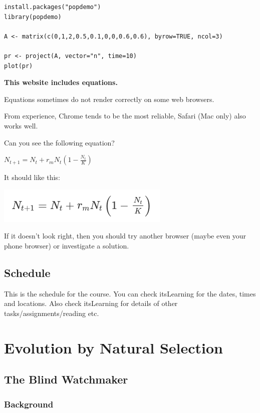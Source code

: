 \documentclass[
  a4paper]{book}
\begin{document}
\begin{verbatim}
install.packages("popdemo")
library(popdemo)

A <- matrix(c(0,1,2,0.5,0.1,0,0,0.6,0.6), byrow=TRUE, ncol=3)

pr <- project(A, vector="n", time=10)
plot(pr)
\end{verbatim}

\begin{do-something}
\textbf{This website includes equations. }

Equations sometimes do not render correctly on some web browsers.

From experience, Chrome tends to be the most reliable, Safari (Mac only)
also works well.

Can you see the following equation?

\(N_{t+1}=N_{t}+r_{m} N_{t}\left(1-\frac{N_{t}}{K}\right)\)

It should like this:

\includegraphics{testEquation.png}

If it doesn't look right, then you should try another browser (maybe
even your phone browser) or investigate a solution.
\end{do-something}

\chapter{Schedule}\label{schedule}

This is the schedule for the course. You can check itsLearning for the dates, times and locations.
Also check itsLearning for details of other tasks/assignments/reading etc.

\part{Evolution by Natural Selection}\label{part-evolution-by-natural-selection}

\chapter{The Blind Watchmaker}\label{the-blind-watchmaker}

\section{Background}\label{background}
\end{document}
